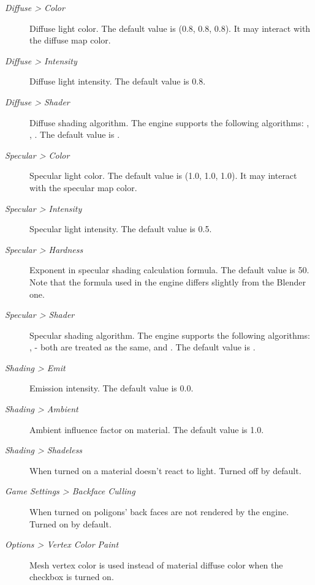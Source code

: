 \documentclass[a4paper,12pt,oneside]{sphinxmanual}
\begin{document}
\begin{description}
\item[{\emph{Diffuse \textgreater{} Color}}] \leavevmode
Diffuse light color. The default value is (0.8, 0.8, 0.8). It may interact with the diffuse map color.

\item[{\emph{Diffuse \textgreater{} Intensity}}] \leavevmode
Diffuse light intensity. The default value is 0.8.

\item[{\emph{Diffuse \textgreater{} Shader}}] \leavevmode
Diffuse shading algorithm. The engine supports the following algorithms: , , . The default value is .

\item[{\emph{Specular \textgreater{} Color}}] \leavevmode
Specular light color. The default value is (1.0, 1.0, 1.0). It may interact with the specular map color.

\item[{\emph{Specular \textgreater{} Intensity}}] \leavevmode
Specular light intensity. The default value is 0.5.

\item[{\emph{Specular \textgreater{} Hardness}}] \leavevmode
Exponent in specular shading calculation formula. The default value is 50. Note that the formula used in the engine differs slightly from the Blender one.

\item[{\emph{Specular \textgreater{} Shader}}] \leavevmode
Specular shading algorithm. The engine supports the following algorithms: ,  - both are treated as the same, and . The default value is .

\item[{\emph{Shading \textgreater{} Emit}}] \leavevmode
Emission intensity. The default value is 0.0.

\item[{\emph{Shading \textgreater{} Ambient}}] \leavevmode
Ambient influence factor on material. The default value is 1.0.

\item[{\emph{Shading \textgreater{} Shadeless}}] \leavevmode
When turned on a material doesn't react to light. Turned off by default.

\item[{\emph{Game Settings \textgreater{} Backface Culling}}] \leavevmode
When turned on poligons' back faces are not rendered by the engine. Turned on by default.

\item[{\emph{Options \textgreater{} Vertex Color Paint}}] \leavevmode
Mesh vertex color is used instead of material diffuse color when the checkbox is turned on.

\end{description}
\end{document}

